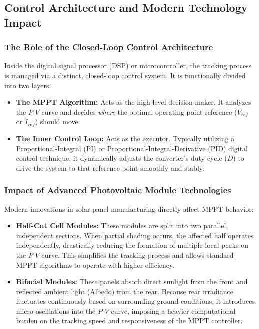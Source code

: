 \subsection{Control Architecture and Modern Technology Impact}

\subsubsection{The Role of the Closed-Loop Control Architecture}
Inside the digital signal processor (DSP) or microcontroller, the tracking process is managed via a distinct, closed-loop control system. It is functionally divided into two layers:
\begin{itemize}
    \item \textbf{The MPPT Algorithm:} Acts as the high-level decision-maker. It analyzes the $P$-$V$ curve and decides \textit{where} the optimal operating point reference ($V_{ref}$ or $I_{ref}$) should move.
    \item \textbf{The Inner Control Loop:} Acts as the executor. Typically utilizing a Proportional-Integral (PI) or Proportional-Integral-Derivative (PID) digital control technique, it dynamically adjusts the converter's duty cycle ($D$) to drive the system to that reference point smoothly and stably.
\end{itemize}

\subsubsection{Impact of Advanced Photovoltaic Module Technologies}
Modern innovations in solar panel manufacturing directly affect MPPT behavior:
\begin{itemize}
    \item \textbf{Half-Cut Cell Modules:} These modules are split into two parallel, independent sections. When partial shading occurs, the affected half operates independently, drastically reducing the formation of multiple local peaks on the $P$-$V$ curve. This simplifies the tracking process and allows standard MPPT algorithms to operate with higher efficiency.
    \item \textbf{Bifacial Modules:} These panels absorb direct sunlight from the front and reflected ambient light (Albedo) from the rear. Because rear irradiance fluctuates continuously based on surrounding ground conditions, it introduces micro-oscillations into the $P$-$V$ curve, imposing a heavier computational burden on the tracking speed and responsiveness of the MPPT controller.
\end{itemize}

